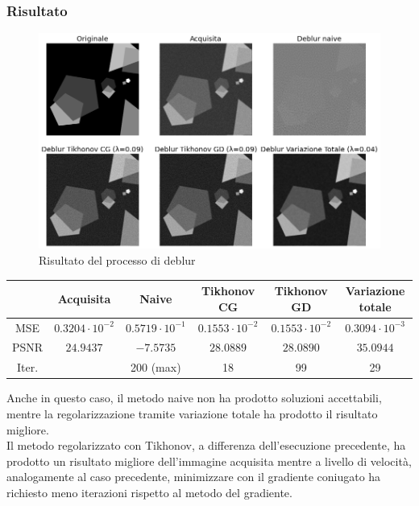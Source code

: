 \documentclass[11pt]{article}
\begin{document}
\subsubsection{Risultato}
\begin{figure}[H]
    \centering
    \includegraphics[width=15cm]{esecuzione/2/deblur.png}
    \caption{Risultato del processo di deblur}
    \label{fig:deblur2}
\end{figure}

\begin{center}
    \begin{tabular}{ |c|c|c|c|c|c| }
    \hline
    & Acquisita & Naive & Tikhonov CG & Tikhonov GD & Variazione totale \\ 
    \hline
    MSE & $0.3204 \cdot 10^{-2}$ & $0.5719 \cdot 10^{-1}$ & $0.1553 \cdot 10^{-2}$ & $0.1553 \cdot 10^{-2}$ & $0.3094 \cdot 10^{-3}$ \\ 
    PSNR & $24.9437$ & $-7.5735$ & $28.0889$ & $28.0890$ & $35.0944$ \\ 
    Iter. & & 200 (max) & 18 & 99 & 29 \\ 
    \hline
    \end{tabular}
\end{center}

Anche in questo caso, il metodo naive non ha prodotto soluzioni accettabili, mentre la regolarizzazione tramite variazione totale ha prodotto il risultato migliore.\\
Il metodo regolarizzato con Tikhonov, a differenza dell'esecuzione precedente, ha prodotto un risultato migliore dell'immagine acquisita mentre a livello di velocità, analogamente al caso precedente, minimizzare con il gradiente coniugato ha richiesto meno iterazioni rispetto al metodo del gradiente.
\end{document}
